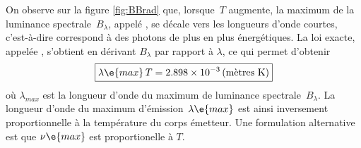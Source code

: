 \sk
On observe sur la figure \ref{fig:BBrad} que, lorsque~$T$ augmente, la maximum de la luminance spectrale~$B_\lambda$, appelé , se décale vers les longueurs d'onde courtes, c'est-à-dire correspond à des photons de plus en plus énergétiques. La loi exacte, appelée , s'obtient en dérivant $B_\lambda$ par rapport à $\lambda$, ce qui permet d'obtenir $$ \boxed{ \lambda\e{max} \, T = 2.898 \times 10^{-3} \, \textrm{(mètres~K)} } $$ où $\lambda_{max}$ est la longueur d'onde du maximum de luminance spectrale~$B_\lambda$. La longueur d'onde du maximum d'émission~$\lambda\e{max}$ est ainsi inversement proportionnelle à la température du corps émetteur. Une formulation alternative est que $\nu\e{max}$ est proportionelle à $T$.



